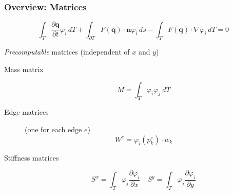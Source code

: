 \documentclass{beamer}
\newcommand{\pd}[2]{\dfrac{\partial #1}{\partial #2}}
\renewcommand{\phi}{\varphi}
\begin{document}

\begin{frame}
  \frametitle{Overview: Matrices}
  \vspace{-.3cm}
  \begin{equation*}
    \int_T \pd {\mathbf{q}}{t} \phi_i \, dT +
    \int_{\partial T} F(\mathbf{q}) \cdot \mathbf{n} \phi_i \, ds -
    \int_T F(\mathbf{q}) \cdot \nabla \phi_i \, dT = 0
  \end{equation*}
  \begin{block}{\emph{Precomputable} matrices (independent of $x$ and $y$)}
    \begin{description}
    \item[Mass matrix]
      \begin{equation}
        \label{eq:mass-matrix-overview}
        M = \int_T \phi_i \phi_j \ dT
      \end{equation}
    \item[Edge matrices] (one for each edge $e$) %
      \begin{equation}
        \label{eq:edge-matrices}
        W^e = \phi_i\left(p_k^e\right) \cdot w_k
      \end{equation}
    \item[Stiffness matrices]
      \begin{equation}
        \label{eq:stiffness-matrix-overview}
        S^x = \int_T \phi_j \pd{\phi_i}{x} \quad
        S^y = \int_T \phi_j \pd{\phi_i}{y}
      \end{equation}
    \end{description}
  \end{block}
\end{frame}
\end{document}

